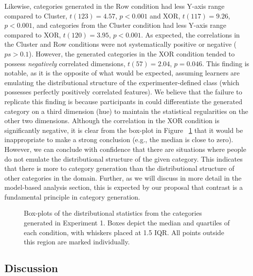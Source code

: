 \documentclass[12pt]{article}
\newcommand\inputpgf[2]{{
\let\pgfimageWithoutPath\pgfimage
\renewcommand{\pgfimage}[2][]{\pgfimageWithoutPath[##1]{#1/##2}}

}}
\begin{document}
\begin{flushleft}
Likewise, categories generated in the Row condition had less Y-axis range compared to Cluster, $t(123) = 4.57$, $p < 0.001$ and XOR, $t(117) = 9.26$, $p < 0.001$, and categories from the Cluster condition had less Y-axis range compared to XOR, $t(120) = 3.95$, $p < 0.001$. As expected, the correlations in the Cluster and Row conditions were not systematically positive or negative ($ps > 0.1$). However, the generated categories in the XOR condition tended to possess {\em negatively} correlated dimensions, $t(57) = 2.04$, $p = 0.046$. This finding is notable, as it is the opposite of what would be expected, assuming learners are emulating the distributional structure of the experimenter-defined class (which possesses perfectly positively correlated features). We believe that the failure to replicate this finding is because participants in \cite{jern2013probabilistic} could differentiate the generated category on a third dimension (hue) to maintain the statistical regularities on the other two dimensions. Although the correlation in the XOR condition is significantly negative, it is clear from the box-plot in Figure ~\ref{fig:e1-statsboxes} that it would be inappropriate to make a strong conclusion (e.g., the median is close to zero). However, we can conclude with confidence that there are situations where people do not emulate the distributional structure of the given category. This indicates that there is more to category generation than the distributional structure of other categories in the domain. Further, as we will discuss in more detail in the model-based analysis section, this is expected by our proposal that contrast is a fundamental principle in category generation.

\begin{figure}
    \begin{center}
    \inputpgf{figs/}{e1-statsboxes.pgf}
    \caption{Box-plots of the distributional statistics from the categories generated in Experiment 1. Boxes depict the median and quartiles of each condition, with whiskers placed at 1.5 IQR. All points outside this region are marked individually.}
    \label{fig:e1-statsboxes}
    \end{center}
\end{figure}


\subsection{Discussion}



\end{flushleft}
\end{document}
